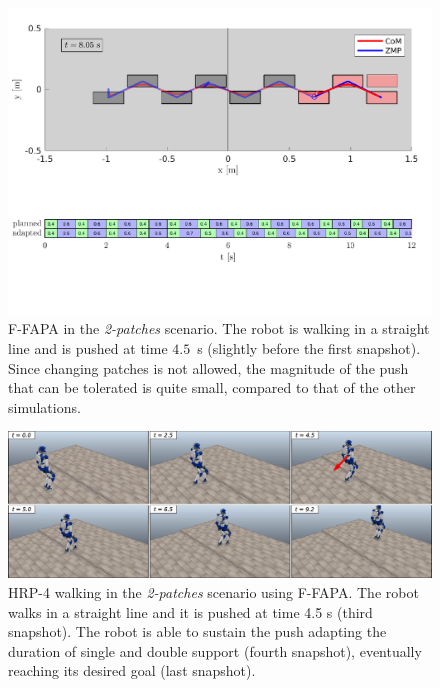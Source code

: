 \begin{figure}
    \includegraphics[trim={0 2.2cm 0 8.6cm},clip,width=\textwidth]{figures/two-patches-fixed-completing-task.pdf}
    \caption{F-FAPA in the {\em 2-patches} scenario. The robot is walking in a straight line and is pushed at time $4.5$~s (slightly before the first snapshot). Since changing patches is not allowed, the magnitude of the push that can be tolerated is quite small, compared to that of the other simulations.}
    \label{fig:FAPA:matlab_2pacf}
\end{figure}

\begin{figure}
    \centering
    \includegraphics[width=\textwidth]{figures/two-patches-push-fixed-snapshots.jpeg}
    \caption{HRP-4 walking in the \textit{2-patches} scenario using F-FAPA. The robot walks in a straight line and it is pushed at time 4.5 s (third snapshot). The robot is able to sustain the push adapting the duration of single and double support (fourth snapshot), eventually reaching its desired goal (last snapshot).}
    \label{fig:FAPA:sim2:snapshots}
\end{figure}

